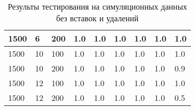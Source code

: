 \begin{table}[H]
\begin{tabular}{|l|l|l|l|l|l|l|l|l|}
    1500                    & 6                      & 200                    & 1.0                        & 1.0                       & 1.0                             & 1.0                       & 1.0                           & 1.0                            \\ \hline
    1500                    & 10                     & 100                    & 1.0                        & 1.0                       & 1.0                             & 1.0                       & 1.0                           & 1.0                            \\ \hline
    1500                    & 10                     & 200                    & 1.0                        & 1.0                       & 1.0                             & 1.0                       & 1.0                           & 0.9                            \\ \hline
    1500                    & 12                     & 100                    & 1.0                        & 1.0                       & 1.0                             & 1.0                       & 1.0                           & 1.0                            \\ \hline
    1500                    & 12                     & 200                    & 1.0                        & 1.0                       & 1.0                             & 1.0                       & 1.0                           & 0.5                            \\ \hline
  \end{tabular}
  \caption{Результы тестирования на симуляционных данных без вставок и удалений}
  \label{table:no_indel_results}
\end{table}
